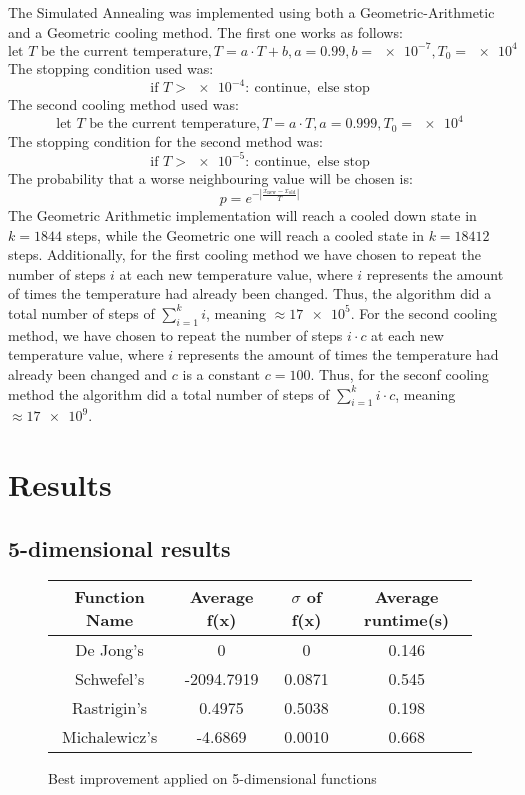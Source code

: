 \documentclass{article}
\newcommand{\euler}{e}
\begin{document}
The Simulated Annealing was implemented using both a Geometric-Arithmetic and a Geometric cooling method. The first one works as follows:
$$ \text{let } T \text{ be the current temperature}, T = a \cdot T + b, a = 0.99, b = \num{e-7}, T_0 = \num{e4} $$
The stopping condition used was:
$$ \text{if } T > \num{e-4}\colon\  \text{continue}, \text{ else stop} $$
The second cooling method used was:
$$ \text{let } T \text{ be the current temperature}, T = a \cdot T, a = 0.999, T_0 = \num{e4} $$
The stopping condition for the second method was:
$$ \text{if } T > \num{e-5}\colon\  \text{continue}, \text{ else stop} $$
The probability that a worse neighbouring value will be chosen is: 
$$p = \euler^{-|\frac{x_{\text{new}} - x_{\text{old}}}{T}|}$$
The Geometric Arithmetic implementation will reach a cooled down state in $ k = 1844 $ steps, while the Geometric one will reach a cooled state in $ k = 18412 $ steps. Additionally, for the first cooling method we have chosen to repeat the number of steps $i$ at each new temperature value, where $i$ represents the amount of times the temperature had already been changed. Thus, the algorithm did a total number of steps of $ \sum_{i = 1}^k i $, meaning $\approx \num{17e5} $. For the second cooling method, we have chosen to repeat the number of steps $i \cdot c$ at each new temperature value, where $i$ represents the amount of times the temperature had already been changed and $c$ is a constant $c = 100$. Thus, for the seconf cooling method the algorithm did a total number of steps of $ \sum_{i = 1}^k i \cdot c $, meaning $\approx \num{17e9} $.

\section{Results}
\subsection{5-dimensional results}

\begin{figure}[H]
\begin{tabular}{|c||c|c|c|} \hline
	Function Name & Average f(x) & $\sigma$ of f(x) & Average runtime(s) \\ \hline \hline
	De Jong's & 0 & 0 & 0.146 \\ \hline
	Schwefel's & -2094.7919 & 0.0871 & 0.545 \\ \hline
	Rastrigin's & 0.4975 & 0.5038 & 0.198 \\ \hline
	Michalewicz's & -4.6869 & 0.0010 & 0.668 \\ \hline
\end{tabular}
\caption{Best improvement applied on 5-dimensional functions}
\end{figure}
\end{document}

